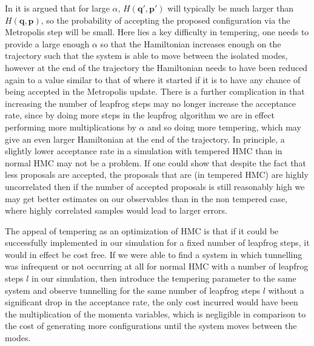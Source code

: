 \documentclass[12pt]{article}
\begin{document}
    In \cite{neal_2011} it is argued that for large $\alpha$, $H\left(\bm{q}',\bm{p}'\right)$ will typically be much larger than $H\left(\bm{q},\bm{p}\right)$, so the probability of accepting the proposed configuration via the Metropolis step will be small. Here lies a key difficulty in tempering, one needs to provide a large enough $\alpha$ so that the Hamiltonian increases enough on the trajectory such that the system is able to move between the isolated modes, however at the end of the trajectory the Hamiltonian needs to have been reduced again to a value similar to that of where it started if it is to have any chance of being accepted in the Metropolis update. There is a further complication in that increasing the number of leapfrog steps may no longer increase the acceptance rate, since by doing more steps in the leapfrog algorithm we are in effect performing more multiplications by $\alpha$ and so doing more tempering, which may give an even larger Hamiltonian at the end of the trajectory. In principle, a slightly lower acceptance rate in a simulation with tempered HMC than in normal HMC may not be a problem. If one could show that despite the fact that less proposals are accepted, the proposals that are (in tempered HMC) are highly uncorrelated then if the number of accepted proposals is still reasonably high we may get better estimates on our observables than in the non tempered case, where highly correlated samples would lead to larger errors. 

    The appeal of tempering as an optimization of HMC is that if it could be successfully implemented in our simulation for a fixed number of leapfrog steps, it would in effect be cost free. If we were able to find a system in which tunnelling was infrequent or not occurring at all for normal HMC with a number of leapfrog steps $l$ in our simulation, then introduce the tempering parameter to the same system and observe tunnelling for the same number of leapfrog steps $l$ without a significant drop in the acceptance rate, the only cost incurred would have been the multiplication of the momenta variables, which is negligible in comparison to the cost of generating more configurations until the system moves between the modes.
\end{document}
